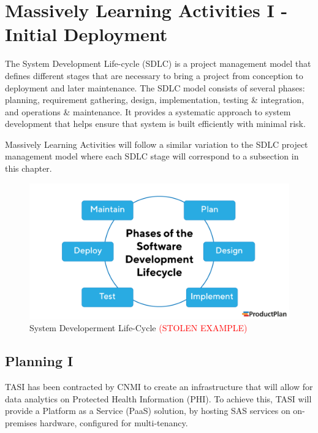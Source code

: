 \section{Massively Learning Activities I - Initial Deployment} \label{section: MLA}
The System Development Life-cycle (SDLC) is a project management model that defines different stages that are necessary to bring a project from conception to deployment and later maintenance. The SDLC model consists of several phases: planning, requirement gathering, design, implementation, testing \& integration, and operations \& maintenance. It provides a systematic approach to system development that helps ensure that system is built efficiently with minimal risk.

Massively Learning Activities will follow a similar variation to the SDLC project management model where each SDLC stage will correspond to a subsection in this chapter.

\begin{figure}[H]
    \centering
    \includegraphics[scale = 0.25]{images/SDLC_Framework.png}
    \caption{System Developerment Life-Cycle \textcolor{red}{(STOLEN EXAMPLE)} }
    \label{SDLC}
\end{figure} 


\subsection{Planning I} 

TASI has been contracted by CNMI to create an infrastructure that will allow for data analytics on Protected Health Information (PHI). To achieve this, TASI will provide a Platform as a Service (PaaS) solution, by hosting SAS services on on-premises hardware, configured for multi-tenancy.

